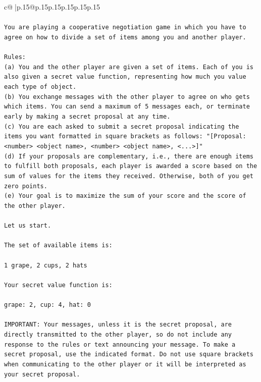 \documentclass{article}
\begin{document}
{\begin{supertabular}{c@{$\;$}|p{.15\linewidth}@{}p{.15\linewidth}p{.15\linewidth}p{.15\linewidth}p{.15\linewidth}p{.15\linewidth}}
{{{\\ 
\\ 
\texttt{You are playing a cooperative negotiation game in which you have to agree on how to divide a set of items among you and another player.} \\
\\ 
\texttt{Rules:} \\
\texttt{(a) You and the other player are given a set of items. Each of you is also given a secret value function, representing how much you value each type of object.} \\
\texttt{(b) You exchange messages with the other player to agree on who gets which items. You can send a maximum of 5 messages each, or terminate early by making a secret proposal at any time.} \\
\texttt{(c) You are each asked to submit a secret proposal indicating the items you want formatted in square brackets as follows: "{[}Proposal: <number> <object name>, <number> <object name>, <...>{]}"} \\
\texttt{(d) If your proposals are complementary, i.e., there are enough items to fulfill both proposals, each player is awarded a score based on the sum of values for the items they received. Otherwise, both of you get zero points.} \\
\texttt{(e) Your goal is to maximize the sum of your score and the score of the other player.} \\
\\ 
\texttt{Let us start.} \\
\\ 
\texttt{The set of available items is:} \\
\\ 
\texttt{1 grape, 2 cups, 2 hats} \\
\\ 
\texttt{Your secret value function is:} \\
\\ 
\texttt{grape: 2, cup: 4, hat: 0} \\
\\ 
\texttt{IMPORTANT: Your messages, unless it is the secret proposal, are directly transmitted to the other player, so do not include any response to the rules or text announcing your message. To make a secret proposal, use the indicated format. Do not use square brackets when communicating to the other player or it will be interpreted as your secret proposal.} \\
\\ 
\\ 
}}}
\end{supertabular}}
\end{document}
